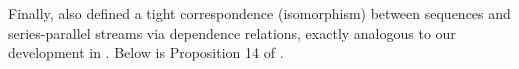 Finally,  also defined a tight correspondence (isomorphism)
between sequences and series-parallel streams via dependence relations,
exactly analogous to our development in .
Below is Proposition 14 of .


